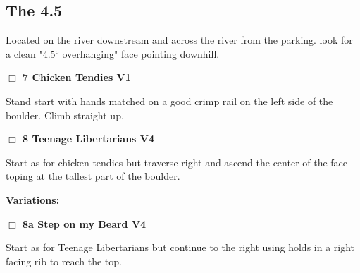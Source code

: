 	\begin{multicols}{2}

\needspace{10em}
\subsection*{The 4.5}\label{bf:The 4.5}

Located on the river downstream and across the river from the parking. look for a clean "4.5° overhanging" face pointing downhill.\\



\needspace{2em}
\label{rt:Chicken Tendies}
\colorbox{green!20}{
\parbox{0.95\linewidth}{
\hspace{-1ex}\textbf{$\Box$
7 Chicken Tendies V1  
}}}
\begin{adjustwidth}{1.3em}{}			

Stand start with hands matched on a good crimp rail on the left side of the boulder. Climb straight up.
\end{adjustwidth}




\needspace{2em}
\label{rt:Teenage Libertarians}
\colorbox{RoyalBlue!20}{
\parbox{0.95\linewidth}{
\hspace{-1ex}\textbf{$\Box$
8 Teenage Libertarians V4  
}}}
\begin{adjustwidth}{1.3em}{}			

Start as for chicken tendies but traverse right and ascend the center of the face toping at the tallest part of the boulder.
\end{adjustwidth}


\begin{adjustwidth}{0.5cm}{}				
\needspace{4em}
\textbf{Variations:} \newline

\needspace{2em}
\label{vr:Step on my Beard}
\colorbox{RoyalBlue!20}{
\parbox{0.95\linewidth}{
\hspace{-1ex}\textbf{$\Box$
8a Step on my Beard V4  
}}}
\begin{adjustwidth}{1.3em}{}			

Start as for Teenage Libertarians but continue to the right using holds in a right facing rib to reach the top.
\end{adjustwidth}



\end{adjustwidth}



\end{multicols}
